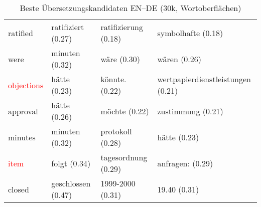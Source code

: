 \documentclass[11pt,twoside,openright]{mpreport}
\begin{document}
\begin{table}[H]
\begin{footnotesize}
\begin{tabular}{|llll|}
ratified                & ratifiziert (0.27) & ratifizierung (0.18) & symbolhafte (0.18) \\ %
were                    & minuten (0.32) & wäre (0.30) & wären (0.26) \\ %
\textcolor{red}{objections}              & hätte (0.23) & könnte. (0.22) & wertpapierdienstleistungen (0.21) \\
approval                & hätte (0.26) & möchte (0.22) & zustimmung (0.21) \\ %
minutes                 & minuten (0.32) & protokoll (0.28) & hätte (0.23) \\ %
\textcolor{red}{item}                    & folgt (0.34) & tagesordnung (0.29) & anfragen: (0.29) \\ %
closed                  & geschlossen (0.47) & 1999-2000 (0.31) & 19.40 (0.31) \\ %
\hline
\end{tabular}\end{footnotesize}\\
\caption{Beste Übersetzungskandidaten EN--DE (30k, Wortoberflächen)}
\end{table}



\end{document}
